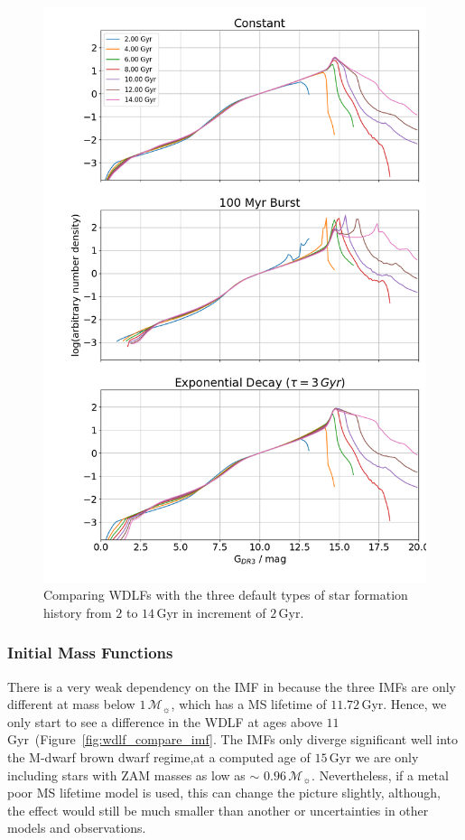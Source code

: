 \documentclass[fleqn,usenatbib]{rasti}
\newcommand{\msun}{\mathcal{M}_{\sun}}
\begin{document}
\begin{figure}
    \centering
    \includegraphics[width=\columnwidth]{wdlf_compare_sfr.png}
    \caption{Comparing WDLFs with the three default types of star formation
    history from $2$ to $14\,$Gyr in increment of $2$\,Gyr.}
    \label{fig:compare_sfr_age_type}
\end{figure}

\subsubsection{Initial Mass Functions}
There is a very weak dependency on the IMF in because the three IMFs are only
different at mass below $1\,\msun$, which has a MS lifetime of $11.72$\,Gyr.
Hence, we only start to see a difference in the WDLF at ages above
$11$\,Gyr~(Figure~\ref{fig:wdlf_compare_imf}. The IMFs only diverge significant
well into the M-dwarf brown dwarf regime,at a computed age of $15$\,Gyr
we are only including stars with ZAM masses as low as $\sim$ $0.96\,\msun$.
Nevertheless, if a metal poor MS lifetime model is used, this can change the
picture slightly, although, the effect would still be much smaller than another
or uncertainties in other models and observations.
\end{document}

